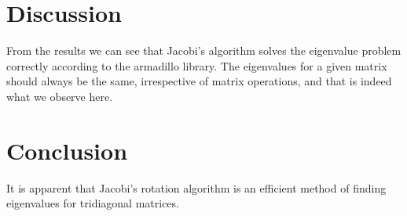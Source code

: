 \section{Discussion}
From the results we can see that Jacobi's algorithm solves the eigenvalue problem correctly according to the armadillo library. The eigenvalues for a given matrix should always be the same, irrespective of matrix operations, and that is indeed what we observe here. 







\section{Conclusion}
It is apparent that Jacobi's rotation algorithm is an efficient method of finding eigenvalues for tridiagonal matrices.





















